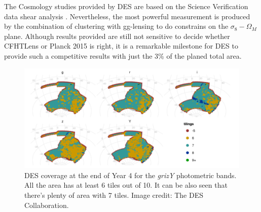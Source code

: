The Cosmology studies provided by DES are based on the Science Verification data shear analysis \cite{2016PhRvD..94b2001A,2016MNRAS.463.3653K}. Nevertheless, the most powerful measurement is produced by the combination of clustering with gg-lensing \cite{2017MNRAS.464.4045K} to do constrains on the $\sigma_8-\Omega_M$ plane. Although results provided are still not sensitive to decide whether CFHTLens or Planck 2015 is right, it is a remarkable milestone for DES to provide such a competitive results with just the 3\% of the planed total area.
\begin{figure}
\begin{center}
\includegraphics[width=\textwidth]{./Pictures/des_tiles.png}
\caption{DES coverage at the end of Year 4 for the {\it grizY} photometric bands. All the area has at least 6 tiles out of 10. It can be also seen that there's plenty of area with 7 tiles. Image credit: The DES Collaboration.}
\label{fig:des_coverage}
\end{center}
\end{figure}
